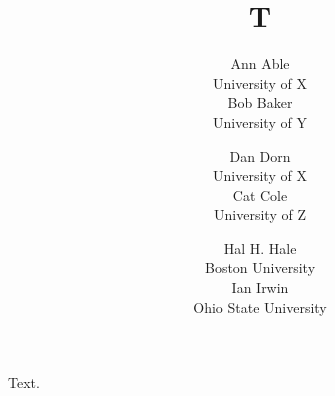 \documentclass{article}
\title{T}
\author{Ann Able \\[2pt]
University of X \\[12pt]
Bob Baker \\[2pt]
University of Y
\and Dan Dorn \\[3pt]
University of X \\[3pt]
Cat Cole \\
University of Z
\and Hal H. Hale \\[2pt]
Boston University \\[12pt]
Ian Irwin \\
Ohio State University}
\begin{document}
\maketitle
Text.
\end{document}
